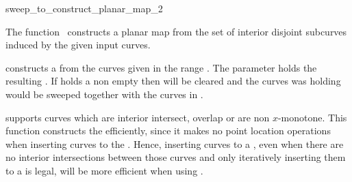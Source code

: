 

\begin{ccRefFunction}{sweep_to_construct_planar_map_2}  %


\ccDefinition
  
The function \ccRefName\ constructs a planar map from the set of 
interior disjoint subcurves induced by the given input curves.



\def\ccLongParamLayout{\ccTrue} 


constructs a  from the curves given in the range
\ccStyle{[curves_begin, curves_end)}. The parameter 
holds the resulting . If  holds a
non empty  then  will be
cleared and the curves  was holding would be sweeped
together with the curves in \ccStyle{[curves_begin, curves_end)}.

 supports curves which are
interior intersect, overlap or are non $x$-monotone. 
This function constructs the 
efficiently, since it makes no point location operations when
inserting curves to the . Hence, inserting curves to a
, even when there are no interior intersections
between those curves and only iteratively inserting them to a
 is legal, will be more efficient when using
.


\end{ccRefFunction}

